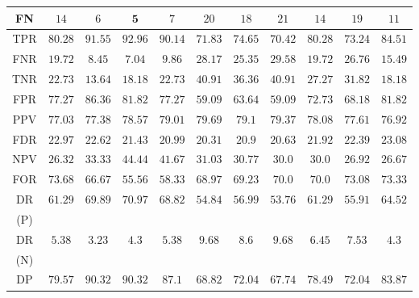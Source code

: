 \let\LaTeXcline\cline\documentclass[sn-mathphys-num]{sn-jnl}\let\cline\LaTeXcline
\begin{document}
\begin{table}[!ht]
\begin{tabular}{|c|c|c|c|c|c|c|c|c|c|c|}
        FN & $14$ & $6$ & $\mathbf{5}$ & $7$ & $20$ & $18$ & $21$ & $14$ & $19$ & $11$ \\ \hline
        TPR & $80.28$ & $91.55$ & $\mathbf{92.96}$ & $90.14$ & $71.83$ & $74.65$ & $70.42$ & $80.28$ & $73.24$ & $84.51$ \\ \hline
        FNR & $19.72$ & $8.45$ & $\mathbf{7.04}$ & $9.86$ & $28.17$ & $25.35$ & $29.58$ & $19.72$ & $26.76$ & $15.49$ \\ \hline
        TNR & $22.73$ & $13.64$ & $18.18$ & $22.73$ & $\mathbf{40.91}$ & $36.36$ & $\mathbf{40.91}$ & $27.27$ & $31.82$ & $18.18$ \\ \hline
        FPR & $77.27$ & $86.36$ & $81.82$ & $77.27$ & $\mathbf{59.09}$ & $63.64$ & $\mathbf{59.09}$ & $72.73$ & $68.18$ & $81.82$ \\ \hline
        PPV & $77.03$ & $77.38$ & $78.57$ & $79.01$ & $\mathbf{79.69}$ & $79.1$ & $79.37$ & $78.08$ & $77.61$ & $76.92$ \\ \hline
        FDR & $22.97$ & $22.62$ & $21.43$ & $20.99$ & $\mathbf{20.31}$ & $20.9$ & $20.63$ & $21.92$ & $22.39$ & $23.08$ \\ \hline
        NPV & $26.32$ & $33.33$ & $\mathbf{44.44}$ & $41.67$ & $31.03$ & $30.77$ & $30.0$ & $30.0$ & $26.92$ & $26.67$ \\ \hline
        FOR & $73.68$ & $66.67$ & $\mathbf{55.56}$ & $58.33$ & $68.97$ & $69.23$ & $70.0$ & $70.0$ & $73.08$ & $73.33$ \\ \hline
        DR & \multirow{2}{*}{$61.29$} & \multirow{2}{*}{$69.89$} & \multirow{2}{*}{$\mathbf{70.97}$} & \multirow{2}{*}{$68.82$} & \multirow{2}{*}{$54.84$} & \multirow{2}{*}{$56.99$} & \multirow{2}{*}{$53.76$} & \multirow{2}{*}{$61.29$} & \multirow{2}{*}{$55.91$} & \multirow{2}{*}{$64.52$} \\
        (P) & & & & & & & & & & \\ \hline
        DR & \multirow{2}{*}{$5.38$} & \multirow{2}{*}{$3.23$} & \multirow{2}{*}{$4.3$} & \multirow{2}{*}{$5.38$} & \multirow{2}{*}{$\mathbf{9.68}$} & \multirow{2}{*}{$8.6$} & \multirow{2}{*}{$\mathbf{9.68}$} & \multirow{2}{*}{$6.45$} & \multirow{2}{*}{$7.53$} & \multirow{2}{*}{$4.3$} \\
        (N) & & & & & & & & & & \\ \hline
        DP & \multirow{2}{*}{$79.57$} & \multirow{2}{*}{$\mathbf{90.32}$} & \multirow{2}{*}{$\mathbf{90.32}$} & \multirow{2}{*}{$87.1$} & \multirow{2}{*}{$68.82$} & \multirow{2}{*}{$72.04$} & \multirow{2}{*}{$67.74$} & \multirow{2}{*}{$78.49$} & \multirow{2}{*}{$72.04$} & \multirow{2}{*}{$83.87$} \\      

\end{tabular}
\end{table}
\end{document}
